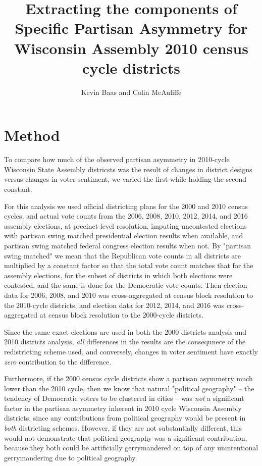\documentclass[preprint,12pt]{article}
\begin{document}
\title{Extracting the components of Specific Partisan Asymmetry for Wisconsin Assembly 2010 census cycle districts}
\author{Kevin Baas and Colin McAuliffe}
\maketitle

\section{Method}

To compare how much of the observed partisan asymmetry in 2010-cycle Wisconsin State Assembly districsts was the result of changes in district designs versus changes in voter sentiment, we varied the first while holding the second constant.

For this analysis we used official districting plans for the 2000 and 2010 census cycles, and actual vote counts from the 2006, 2008, 2010, 2012, 2014, and 2016 assembly elections, at precinct-level resolution, imputing uncontested elections with partisan swing matched presidential election results when available, and partisan swing matched federal congress election results when not.
By "partisan swing matched" we mean that the Republican vote counts in all districts are multiplied by a constant factor so that the total vote count matches that for the assembly elections, for the subset of districts in which both elections were contested, and the same is done for the Democratic vote counts.
Then election data for 2006, 2008, and 2010 was cross-aggregated at census block resolution to the 2010-cycle districts, and election data for 2012, 2014, and 2016 was cross-aggregated at census block resolution to the 2000-cycle districts. 
 
Since the same exact elections are used in both the 2000 districts analysis and 2010 districts analysis, \emph{all} differences in the results are the consequnece of the redistricting scheme used, and conversely, changes in voter sentiment have exactly \emph{zero} contribution to the difference.

Furthermore, if the 2000 census cycle districts show a partisan asymmetry much lower than the 2010 cycle, then we know that natural "political geography" -- the tendency of Democratic voters to be clustered in cities -- was \emph{not} a significant factor in the partisan asymmetry inherent in 2010 cycle Wisconsin Assembly districts, since any contributions from political geography would be present in \emph{both} districting schemes.
However, if they are not substantially different, this would not demonstrate that political geography was a significant contribution, because they both could be artificially gerrymandered on top of any unintentional gerrymandering due to political geography.
\end{document}
